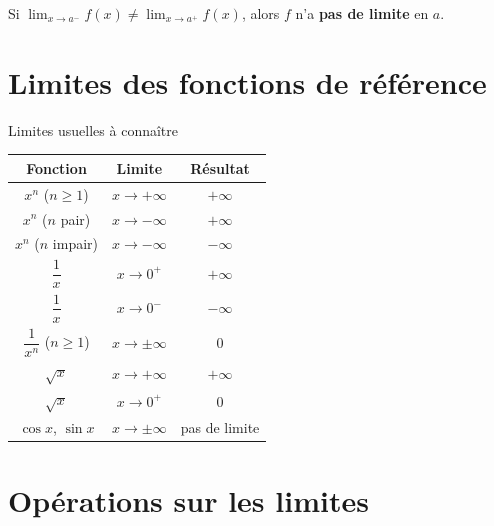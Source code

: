 \begin{remarque}
	Si $\displaystyle\lim_{x\to a^-}f(x) \neq \lim_{x\to a^+}f(x)$,
	alors $f$ n'a \textbf{pas de limite} en $a$.
\end{remarque}

\section{Limites des fonctions de référence}

\begin{propriete}{Limites usuelles à connaître}{}
	\begin{center}
		\renewcommand{\arraystretch}{2.0}
		\begin{tabular}{|c|c|c|}
			\hline
			\textbf{Fonction} & \textbf{Limite} & \textbf{Résultat} \\
			\hline
			$x^n$ ($n\geq 1$) & $x\to+\infty$ & $+\infty$ \\
			\hline
			$x^n$ ($n$ pair) & $x\to-\infty$ & $+\infty$ \\
			\hline
			$x^n$ ($n$ impair) & $x\to-\infty$ & $-\infty$ \\
			\hline
			$\dfrac{1}{x}$ & $x\to 0^+$ & $+\infty$ \\
			\hline
			$\dfrac{1}{x}$ & $x\to 0^-$ & $-\infty$ \\
			\hline
			$\dfrac{1}{x^n}$ ($n\geq 1$) & $x\to\pm\infty$ & $0$ \\
			\hline
			$\sqrt{x}$ & $x\to+\infty$ & $+\infty$ \\
			\hline
			$\sqrt{x}$ & $x\to 0^+$ & $0$ \\
			\hline
			$\cos x$, $\sin x$ & $x\to\pm\infty$ & pas de limite \\
			\hline
		\end{tabular}
	\end{center}
\end{propriete}

\section{Opérations sur les limites}

